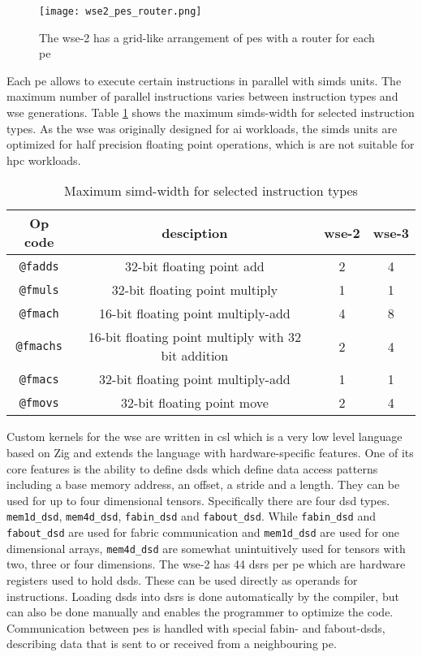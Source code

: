 \begin{figure}[h]
    \centering
    \texttt{[image: wse2\_pes\_router.png]}
    \caption{The \ac{wse}-2 has a grid-like arrangement of \acp{pe} with a router for each \ac{pe} \cite{lie2023cerebras}}
    \label{fig:wse2_pes_router}
\end{figure}

Each \ac{pe} allows to execute certain instructions in parallel with \acp{simd} units. The maximum number of parallel instructions varies between instruction types and \ac{wse} generations. Table \ref{tab:simd_operations} shows the maximum \acp{simd}-width for selected instruction types. As the \ac{wse} was originally designed for \ac{ai} workloads, the \acp{simd} units are optimized for half precision floating point operations, which is are not suitable for \ac{hpc} workloads. 

\begin{table}[h]
    \centering
    \caption{Maximum \ac{simd}-width for selected instruction types}
    \label{tab:simd_operations}
    \begin{tabular}{@{}cccc@{}}
        \toprule
        Op code & desciption & \ac{wse}-2 & \ac{wse}-3 \\
        \midrule
        \texttt{@fadds} & 32-bit floating point add & 2 & 4 \\
        \texttt{@fmuls} & 32-bit floating point multiply & 1 & 1 \\
        \texttt{@fmach} & 16-bit floating point multiply-add & 4 & 8 \\
        \texttt{@fmachs} & 16-bit floating point multiply with 32 bit addition & 2 & 4 \\
        \texttt{@fmacs} & 32-bit floating point multiply-add & 1 & 1 \\
        \texttt{@fmovs} & 32-bit floating point move & 2 & 4 \\
        \bottomrule
    \end{tabular}
\end{table}

Custom kernels for the \ac{wse} are written in \ac{csl} which is a very low level language based on Zig and extends the language with hardware-specific features.
One of its core features is the ability to define \acp{dsd} which define data access patterns including a base memory address, an offset, a stride and a length. They can be used for up to four dimensional tensors. Specifically there are four \ac{dsd} types. \texttt{mem1d\_dsd}, \texttt{mem4d\_dsd}, \texttt{fabin\_dsd} and \texttt{fabout\_dsd}. While \texttt{fabin\_dsd} and \texttt{fabout\_dsd} are used for fabric communication and \texttt{mem1d\_dsd} are used for one dimensional arrays, \texttt{mem4d\_dsd} are somewhat unintuitively used for tensors with two, three or four dimensions. The \ac{wse}-2 has 44 \acp{dsr} per \ac{pe} which are hardware registers used to hold \acp{dsd}. These can be used directly as operands for instructions. Loading \acp{dsd} into \acp{dsr} is done automatically by the compiler, but can also be done manually and enables the programmer to optimize the code. Communication between \acp{pe} is handled with special fabin- and fabout-\acp{dsd}, describing data that is sent to or received from a neighbouring \ac{pe}.

